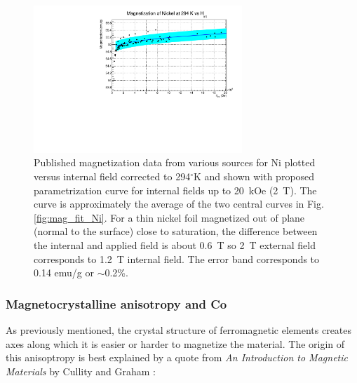 \documentclass[12pt]{article}
\begin{document}
\begin{figure}
\centering
\includegraphics[width=0.7\textwidth]{NiCombinedFitErrorBand_vs_Hint.pdf}
\caption{Published magnetization data from various sources for Ni plotted versus internal field corrected to 294$^{\circ}$K and shown with proposed parametrization curve for internal fields up to 20~kOe (2~T). The curve is approximately the average of the two central curves in Fig. \ref{fig:mag_fit_Ni}. For a thin nickel foil magnetized out of plane (normal to the surface) close to saturation, the difference between the internal and applied field is about 0.6~T so 2~T external field corresponds to 1.2~T internal field. The error band corresponds to 0.14 emu/g or $\sim$0.2\%. }
\label{fig:mag_errorband_Ni}
\end{figure}
\FloatBarrier
\subsubsection{Magnetocrystalline anisotropy and Co}
As previously mentioned, the crystal structure of ferromagnetic elements  creates axes along which it is easier or harder to magnetize the material. The origin of this anisoptropy is best explained by a quote from {\it An Introduction to Magnetic Materials} by Cullity and Graham \cite{Cullity2008}:
\end{document}
